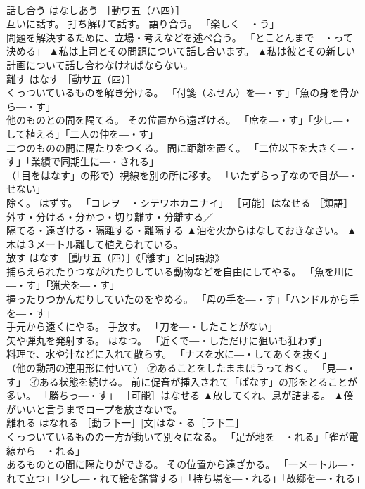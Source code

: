 \documentclass[8pt]{extreport}
\begin{document}
\begin{CJK}{UTF8}{min}
\\	話し合う	はなしあう	［動ワ五（ハ四）］ 
\\	互いに話す。 打ち解けて話す。 語り合う。 「楽しく―・う」 
\\	問題を解決するために、立場・考えなどを述べ合う。 「とことんまで―・って決める」	▲私は上司とその問題について話し合います。 ▲私は彼とその新しい計画について話し合わなければならない。
\\	離す	はなす	［動サ五（四）］ 
\\	くっついているものを解き分ける。 「付箋（ふせん）を―・す」「魚の身を骨から―・す」 
\\	他のものとの間を隔てる。 その位置から遠ざける。 「席を―・す」「少し―・して植える」「二人の仲を―・す」 
\\	二つのものの間に隔たりをつくる。 間に距離を置く。 「二位以下を大きく―・す」「業績で同期生に―・される」 
\\	（「目をはなす」の形で）視線を別の所に移す。 「いたずらっ子なので目が―・せない」 
\\	除く。 はずす。 「コレヲ―・シテワホカニナイ」 ［可能］はなせる ［類語］
\\	外す・分ける・分かつ・切り離す・分離する／
\\	隔てる・遠ざける・隔離する・離隔する	▲油を火からはなしておきなさい。 ▲木は３メートル離して植えられている。
\\	放す	はなす	［動サ五（四）］《「離す」と同語源》 
\\	捕らえられたりつながれたりしている動物などを自由にしてやる。 「魚を川に―・す」「猟犬を―・す」 
\\	握ったりつかんだりしていたのをやめる。 「母の手を―・す」「ハンドルから手を―・す」 
\\	手元から遠くにやる。 手放す。 「刀を―・したことがない」 
\\	矢や弾丸を発射する。 はなつ。 「近くで―・しただけに狙いも狂わず」 
\\	料理で、水や汁などに入れて散らす。 「ナスを水に―・してあくを抜く」 
\\	（他の動詞の連用形に付いて） ㋐あることをしたままほうっておく。 「見―・す」 ㋑ある状態を続ける。 前に促音が挿入されて「ぱなす」の形をとることが多い。 「勝ちっ―・す」 ［可能］はなせる	▲放してくれ、息が詰まる。 ▲僕がいいと言うまでロープを放さないで。
\\	離れる	はなれる	［動ラ下一］[文]はな・る［ラ下二］ 
\\	くっついているものの一方が動いて別々になる。 「足が地を―・れる」「雀が電線から―・れる」 
\\	あるものとの間に隔たりができる。 その位置から遠ざかる。 「一メートル―・れて立つ」「少し―・れて絵を鑑賞する」「持ち場を―・れる」「故郷を―・れる」 

\end{CJK}
\end{document}
